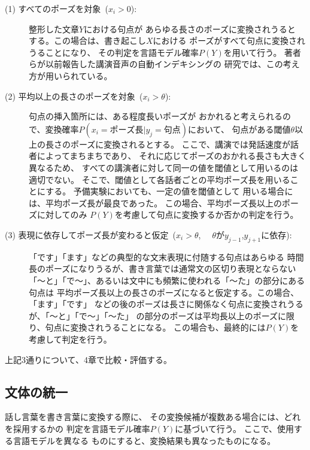 \begin{description}
\item[(1)  すべてのポーズを対象\verb+ +($x_i > 0$):]

整形した文章$Y$における句点が
あらゆる長さのポーズに変換されうると
する。この場合は、書き起こし$X$における
ポーズがすべて句点に変換されうることになり、
その判定を言語モデル確率$P(Y)$を用いて行う。
著者らが以前報告した講演音声の自動インデキシングの
研究\cite{hasegawa}では、この考え方が用いられている。

\item[(2)  平均以上の長さのポーズを対象\verb+ +($x_i > \theta$):]

句点の挿入箇所には、ある程度長いポーズが
おかれると考えられるので、変換確率$P(x_i=ポーズ長|y_j=句点)$において、
句点がある閾値$\theta$以上の長さのポーズに変換されるとする。
ここで、講演では発話速度が話者によってまちまちであり、
それに応じてポーズのおかれる長さも大きく異なるため、
すべての講演者に対して同一の値を閾値として用いるのは適切でない。
そこで、閾値として各話者ごとの平均ポーズ長を用いることにする。
予備実験においても、一定の値を閾値として
用いる場合には、平均ポーズ長が最良であった。
この場合、平均ポーズ長以上のポーズに対してのみ
$P(Y)$を考慮して句点に変換するか否かの判定を行う。

\item[(3)  表現に依存してポーズ長が変わると仮定\verb+ +($x_i > \theta$,\verb+  + 
$\theta$が$y_{j-1}$,$y_{j+1}$に依存):]

「です」「ます」などの典型的な文末表現に付随する句点はあらゆる
時間長のポーズになりうるが、書き言葉では通常文の区切り表現とならない
「〜と」「で〜」、あるいは文中にも頻繁に使われる「〜た」の部分にある句点は
平均ポーズ長以上の長さのポーズになると仮定する。この場合、「ます」「です」
などの後のポーズは長さに関係なく句点に変換されうるが、「〜と」「で〜」「〜た」
の部分のポーズは平均長以上のポーズに限り、句点に変換されうることになる。
この場合も、最終的には$P(Y)$を考慮して判定を行う。
\end{description}

上記3通りについて、4章で比較・評価する。

\subsection{文体の統一}

話し言葉を書き言葉に変換する際に、
その変換候補が複数ある場合には、どれを採用するかの
判定を言語モデル確率$P(Y)$に基づいて行う。
ここで、使用する言語モデルを異なる
ものにすると、変換結果も異なったものになる。

